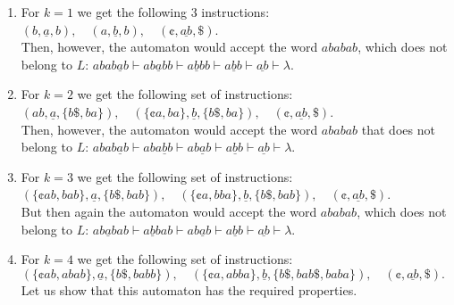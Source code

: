\begin{enumerate}
\item For $k = 1$ we get the following 3 instructions:\\
$(b, \underline{a}, b),\quad
 (a, \underline{b}, b),\quad
 (\cent, \underline{ab}, \$)$.\\
Then, however,  the automaton would accept the word $ababab$, which does not belong to $L$: $abab\underline{a}b \vdash ab\underline{a}bb \vdash a\underline{b}bb \vdash a\underline{b}b \vdash \underline{ab} \vdash \lambda$.

\item For $k = 2$ we get the following set of instructions:\\
$(ab, \underline{a}, \{b\$, ba\}),\quad
 (\{\cent a, ba\}, \underline{b}, \{b\$, ba\}),\quad
 (\cent, \underline{ab}, \$)$.\\
Then, however, the automaton would accept the word $ababab$ that does not belong to $L$: $abab\underline{a}b \vdash aba\underline{b}b \vdash ab\underline{a}b \vdash a\underline{b}b \vdash \underline{ab} \vdash \lambda$.

\item For $k = 3$ we get the following set of instructions:\\
$(\{\cent ab, bab\}, \underline{a}, \{b\$, bab\}),\quad
 (\{\cent a, bba\}, \underline{b}, \{b\$, bab\}),\quad
 (\cent, \underline{ab}, \$)$.\\
But then again the automaton would accept the word $ababab$, which does not belong to $L$: $ab\underline{a}bab \vdash a\underline{b}bab \vdash ab\underline{a}b \vdash a\underline{b}b \vdash \underline{ab} \vdash \lambda$.

\item For $k = 4$ we get the following set of instructions:\\
$(\{\cent ab, abab\},\underline{a},\{b\$, babb\}), \quad
(\{\cent a, abba\},\underline{b},\{b\$,bab\$,baba\}), \quad
   (\cent,\underline{ab},\$).$\\
Let us show that this automaton has the required properties.
\end{enumerate}

